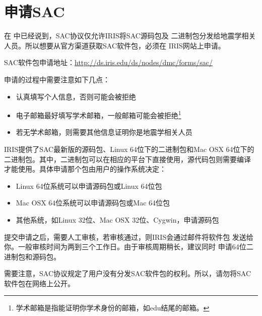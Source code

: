 \section{申请SAC}
在  中已经说到，SAC协议仅允许IRIS将SAC源码包及
二进制包分发给地震学相关人员。所以想要从官方渠道获取SAC软件包，必须在
IRIS网站上申请。

SAC软件包申请地址：\url{http://ds.iris.edu/ds/nodes/dmc/forms/sac/}

申请的过程中需要注意如下几点：
\begin{itemize}
\item 认真填写个人信息，否则可能会被拒绝
\item 电子邮箱最好填写学术邮箱，一般邮箱可能会被拒绝\footnote{学术邮箱是指能证明你学术身份的邮箱，如edu结尾的邮箱。}
\item 若无学术邮箱，则需要其他信息证明你是地震学相关人员
\end{itemize}

IRIS提供了SAC最新版的源码包、Linux 64位下的二进制包和Mac OSX 64位下的
二进制包。其中，二进制包可以在相应的平台下直接使用，源代码包则需要编译
才能使用。具体申请那个包由用户的操作系统决定：
\begin{itemize}
\item Linux 64位系统可以申请源码包或Linux 64位包
\item Mac OSX 64位系统可以申请源码包或Mac 64位包
\item 其他系统，如Linux 32位、Mac OSX 32位、Cygwin，申请源码包
\end{itemize}

提交申请之后，需要人工审核，若审核通过，则IRIS会通过邮件将软件包
发送给你。一般审核时间为两到三个工作日。由于审核周期稍长，建议同时
申请64位二进制包和源码包。

需要注意，SAC协议规定了用户没有分发SAC软件包的权利。所以，请勿将SAC
软件包在网络上公开。
